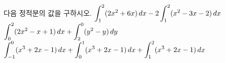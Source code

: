 다음 정적분의 값을 구하시오.
 $\displaystyle\int_{1}^{2}(2x^2+6x)\mkern3mu dx-2\int_{1}^{2}(x^2-3x-2)\mkern3mu dx$
 $\displaystyle\int_{0}^{2}(2x^2-x+1)\mkern3mu dx+\int_{2}^{0}(y^2-y)\mkern3mu dy$
 $\displaystyle\int_{-1}^{0}(x^3+2x-1)\mkern3mu dx+\int_{0}^{1}(x^3+2x-1)\mkern3mu dx+\int_{1}^{2}(x^3+2x-1)\mkern3mu dx$
